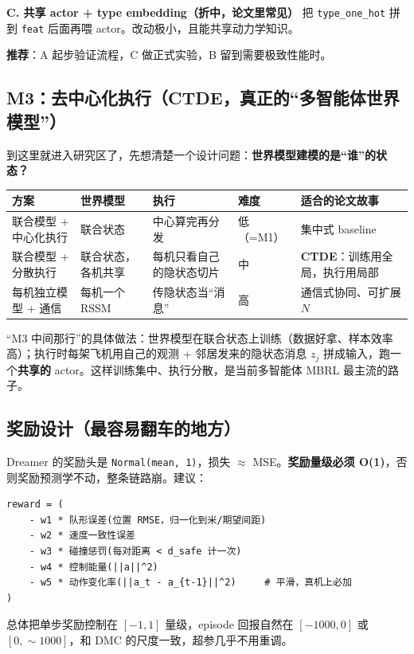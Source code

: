 \documentclass[11pt]{ctexart}
\begin{document}
\textbf{C. 共享 actor + type embedding（折中，论文里常见）}
把 \texttt{type\_one\_hot} 拼到 \texttt{feat} 后面再喂 actor。改动极小，且能共享动力学知识。

\textbf{推荐}：A 起步验证流程，C 做正式实验，B 留到需要极致性能时。

\subsection{M3：去中心化执行（CTDE，真正的``多智能体世界模型''）}
到这里就进入研究区了，先想清楚一个设计问题：\textbf{世界模型建模的是``谁''的状态？}
\begin{tabularx}{\textwidth}{L L L L L}
\toprule
\textbf{方案} & \textbf{世界模型} & \textbf{执行} & \textbf{难度} & \textbf{适合的论文故事} \\
\midrule
联合模型 + 中心化执行 & 联合状态 & 中心算完再分发 & 低（=M1） & 集中式 baseline \\
\addlinespace
联合模型 + 分散执行 & 联合状态，各机共享 & 每机只看自己的隐状态切片 & 中 & \textbf{CTDE}：训练用全局，执行用局部 \\
\addlinespace
每机独立模型 + 通信 & 每机一个 RSSM & 传隐状态当``消息'' & 高 & 通信式协同、可扩展 $N$ \\
\bottomrule
\end{tabularx}

``M3 中间那行''的具体做法：世界模型在联合状态上训练（数据好拿、样本效率高）；执行时每架飞机用自己的观测 + 邻居发来的隐状态消息 $z_j$ 拼成输入，跑一个\textbf{共享的} actor。这样训练集中、执行分散，是当前多智能体 MBRL 最主流的路子。

\subsection{奖励设计（最容易翻车的地方）}
Dreamer 的奖励头是 \texttt{Normal(mean, 1)}，损失 $\approx$ MSE。\textbf{奖励量级必须 O(1)}，否则奖励预测学不动，整条链路崩。建议：
\begin{Verbatim}[frame=single,fontsize=\small]
reward = (
    - w1 * 队形误差(位置 RMSE，归一化到米/期望间距)
    - w2 * 速度一致性误差
    - w3 * 碰撞惩罚(每对距离 < d_safe 计一次)
    - w4 * 控制能量(||a||^2)
    - w5 * 动作变化率(||a_t - a_{t-1}||^2)     # 平滑，真机上必加
)
\end{Verbatim}
总体把单步奖励控制在 $[-1,1]$ 量级，episode 回报自然在 $[-1000,0]$ 或 $[0,\sim1000]$，和 DMC 的尺度一致，超参几乎不用重调。
\end{document}

